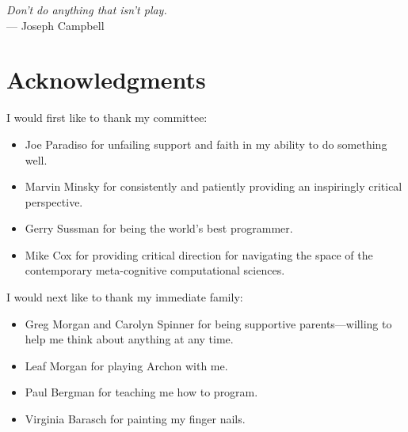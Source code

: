 



\begin{flushright}{\slshape    
Don't do anything that isn't play.} \\ \medskip
    --- Joseph Campbell
\end{flushright}



\bigskip

\begingroup
\let\clearpage\relax
\let\cleardoublepage\relax
\let\cleardoublepage\relax
\chapter*{Acknowledgments}

I would first like to thank my committee:

\begin{itemize}
\item{Joe Paradiso for unfailing support and faith in my ability to do
  something well.}
\item{Marvin Minsky for consistently and patiently providing an
  inspiringly critical perspective.}
\item{Gerry Sussman for being the world's best programmer.}
\item{Mike Cox for providing critical direction for navigating the
  space of the contemporary meta-cognitive computational sciences.}
\end{itemize}

I would next like to thank my immediate family:

\begin{itemize}
\item{Greg Morgan and Carolyn Spinner for being supportive parents---willing to help me think about anything at any time.}
\item{Leaf Morgan for playing Archon with me.}
\item{Paul Bergman for teaching me how to program.}
\item{Virginia Barasch for painting my finger nails.}
\end{itemize}



\endgroup



